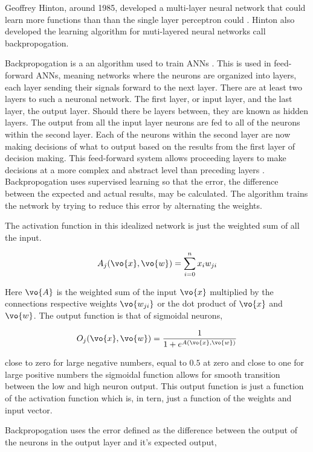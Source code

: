 Geoffrey Hinton, around 1985, developed a multi-layer neural network that could learn more functions than than the single layer perceptron could \citep{mo2012survey}.
Hinton also developed the learning algorithm for muti-layered neural networks call backpropogation.

Backpropogation is a an algorithm used to train ANNs \cite{mcclelland1986parallel}.
This is used in feed-forward ANNs, meaning networks where the neurons are organized into layers, each layer sending their signals forward to the next layer.
There are at least two layers to such a neuronal network.
The first layer, or input layer, and the last layer, the output layer.
Should there be layers between, they are known as hidden layers.
The output from all the input layer neurons are fed to all of the neurons within the second layer.
Each of the neurons within the second layer are now making decisions of what to output based on the results from the first layer of decision making.
This feed-forward system allows proceeding layers to make decisions at a more complex and abstract level than preceding layers \citep{krose1993introduction}.
Backpropogation uses supervised learning so that the error, the difference between the expected and actual results, may be calculated.
The algorithm trains the network by trying to reduce this error by alternating the weights.

The activation function in this idealized network is just the weighted sum of all the input.

\begin{equation}
A_j(\vo{x},\vo{w})=\sum^n_{i=0}x_i w_{ji}
\end{equation}

Here $\vo{A}$ is the weighted sum of the input $\vo{x}$ multiplied by the connections respective weights $\vo{w_{ji}}$ or the dot product of $\vo{x}$ and $\vo{w}$.
The output function is that of sigmoidal neurons,

\begin{equation}
O_j (\vo{x},\vo{w}) = \frac{1}{1+e^{A(\vo{x},\vo{w})}}
\end{equation}

close to zero for large negative numbers, equal to $0.5$ at zero and close to one for large positive numbers the sigmoidal function allows for smooth transition between the low and high neuron output.
This output function is just a function of the activation function which is, in tern, just a function of the weights and input vector.

Backpropogation uses the error defined as the difference between the output of the neurons in the output layer and it's expected output,

